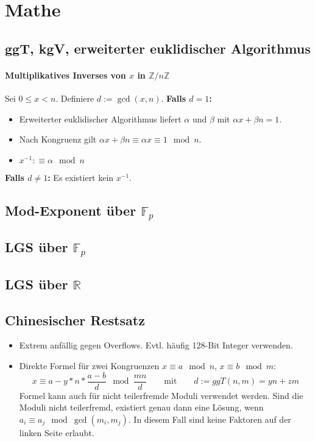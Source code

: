 \section{Mathe}

\subsection{ggT, kgV, erweiterter euklidischer Algorithmus}



\paragraph{Multiplikatives Inverses von $x$ in $\mathbb{Z}/n\mathbb{Z}$}
Sei $0 \leq x < n$. Definiere $d := \gcd(x, n)$.\newline
\textbf{Falls $d = 1$:}
\begin{itemize}[nosep]
	\item Erweiterter euklidischer Algorithmus liefert $\alpha$ und $\beta$ mit
	$\alpha x + \beta n = 1$.
	\item Nach Kongruenz gilt $\alpha x + \beta n \equiv \alpha x \equiv 1 \mod n$.
	\item $x^{-1} :\equiv \alpha \mod n$
	\end{itemize}
\textbf{Falls $d \neq 1$:} Es existiert kein $x^{-1}$.


\subsection{Mod-Exponent über $\mathbb{F}_p$}


\subsection{LGS über $\mathbb{F}_p$}


\subsection{LGS über $\mathbb{R}$}


\subsection{Chinesischer Restsatz}
\begin{itemize}
	\item Extrem anfällig gegen Overflows. Evtl. häufig 128-Bit Integer verwenden.
	\item Direkte Formel für zwei Kongruenzen $x \equiv a \mod n$, $x \equiv b \mod m$:
		\[
			x \equiv a - y * n * \frac{a - b}{d} \mod \frac{mn}{d}
			\qquad \text{mit} \qquad
			d := ggT(n, m) = yn + zm
		\]
		Formel kann auch für nicht teilerfremde Moduli verwendet werden.
		Sind die Moduli nicht teilerfremd, existiert genau dann eine Lösung,
		wenn $a_i \equiv a_j \mod \gcd(m_i, m_j)$. In diesem Fall sind keine Faktoren
		auf der linken Seite erlaubt.
\end{itemize}


